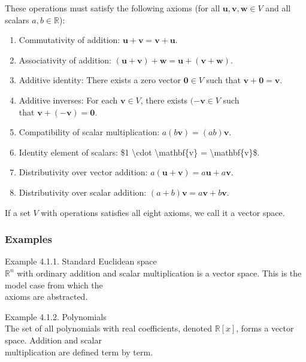 \documentclass[
  12pt,
  a4paper,
]{article}
\begin{document}
These operations must satisfy the following axioms (for all
\(\mathbf{u}, \mathbf{v}, \mathbf{w} \in V\) and all\\
scalars \(a,b \in \mathbb{R}\)):

\begin{enumerate}
\def\labelenumi{\arabic{enumi}.}
\item
  Commutativity of addition:
  \(\mathbf{u} + \mathbf{v} = \mathbf{v} + \mathbf{u}\).
\item
  Associativity of addition:
  \((\mathbf{u} + \mathbf{v}) + \mathbf{w} = \mathbf{u} + (\mathbf{v} + \mathbf{w})\).
\item
  Additive identity: There exists a zero vector \(\mathbf{0} \in V\)
  such that \(\mathbf{v} + \mathbf{0} = \mathbf{v}\).
\item
  Additive inverses: For each \(\mathbf{v} \in V\), there exists
  \((-\mathbf{v} \in V\) such\\
  that \(\mathbf{v} + (-\mathbf{v}) = \mathbf{0}\).
\item
  Compatibility of scalar multiplication:
  \(a(b\mathbf{v}) = (ab)\mathbf{v}\).
\item
  Identity element of scalars: \$1 \textbackslash cdot
  \textbackslash mathbf\{v\} = \textbackslash mathbf\{v\}\$.
\item
  Distributivity over vector addition:
  \(a(\mathbf{u} + \mathbf{v}) = a\mathbf{u} + a\mathbf{v}\).
\item
  Distributivity over scalar addition:
  \((a+b)\mathbf{v} = a\mathbf{v} + b\mathbf{v}\).
\end{enumerate}

If a set \(V\) with operations satisfies all eight axioms, we call it a
vector space.

\subsubsection{Examples}\label{examples-2}

Example 4.1.1. Standard Euclidean space\\
\(\mathbb{R}^n\) with ordinary addition and scalar multiplication is a
vector space. This is the model case from which the\\
axioms are abstracted.

Example 4.1.2. Polynomials\\
The set of all polynomials with real coefficients, denoted
\(\mathbb{R}[x]\), forms a vector space. Addition and scalar\\
multiplication are defined term by term.
\end{document}
